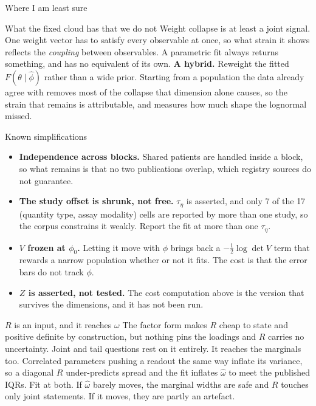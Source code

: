 \documentclass[10pt,aspectratio=169]{beamer}
\begin{document}
\begin{frame}[standout]
  Where I am least sure
\end{frame}

\begin{frame}[t]{What the fixed cloud has that we do not}
  Weight collapse is at least a joint signal. One weight vector has to satisfy
  every observable at once, so what strain it shows reflects the \emph{coupling}
  between observables. A parametric fit always returns something, and has no
  equivalent of its own.
  \vfill
  \textbf{A hybrid.} Reweight the fitted $F(\theta\mid\hat\phi)$ rather than a
  wide prior. Starting from a population the data already agree with removes
  most of the collapse that dimension alone causes, so the strain that remains
  is attributable, and \alert{measures how much shape the lognormal missed}.
\end{frame}

\begin{frame}[t]{Known simplifications}
  \begin{itemize}\setlength\itemsep{8pt}
    \item \textbf{Independence across blocks.} Shared patients are handled inside
      a block, so what remains is that no two publications overlap, which
      registry sources do not guarantee.
    \item \textbf{The study offset is shrunk, not free.} $\tau_\eta$ is asserted,
      and only 7 of the 17 (quantity type, assay modality) cells are reported by
      more than one study, so the corpus constrains it weakly. Report the fit at
      more than one $\tau_\eta$.
    \item \textbf{$V$ frozen at $\phi_0$.} Letting it move with $\phi$ brings
      back a $-\tfrac12\log\det V$ term that rewards a narrow population whether
      or not it fits. The cost is that the error bars do not track $\phi$.
    \item \textbf{$Z$ is asserted, not tested.} The cost computation above is the
      version that survives the dimensions, and it has not been run.
  \end{itemize}
\end{frame}

\begin{frame}[t]{$R$ is an input, and it reaches $\omega$}
  The factor form makes $R$ cheap to state and positive definite by construction,
  but nothing pins the loadings and $R$ carries no uncertainty. Joint and tail
  questions rest on it entirely.
  \vfill
  It reaches the marginals too. Correlated parameters pushing a readout the same
  way inflate its variance, so a diagonal $R$ under-predicts spread and the fit
  inflates $\hat\omega$ to meet the published IQRs.
  \vfill
  Fit at both. If $\hat\omega$ barely moves, the marginal widths are safe and
  $R$ touches only joint statements. If it moves, they are partly an artefact.
\end{frame}
\end{document}
